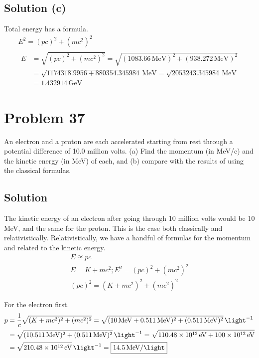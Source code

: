 \documentclass[12pt]{article}
\newcommand{\E}[1]{\times 10^{#1}}
\begin{document}
    \subsection{Solution (c)}
        Total energy has a formula.
        \begin{gather}
            E^2 = (pc)^2 + (mc^2)^2\\
            \begin{align}
                E   &=  \sqrt{(pc)^2 + (mc^2)^2}
                    =   \sqrt{(1083.66\,\unit{\mega\eV})^2 + (938.272\,\unit{\mega\eV})^2}\\
                    &=  \sqrt{1 174 318.9956 + 880 354.345984}\,\unit{\mega\eV}
                    =   \sqrt{2 053 243.345984}\,\unit{\mega\eV}\\
                    &=  \boxed{1.432914\,\unit{\giga\eV}}
            \end{align}
        \end{gather}
    \pagebreak

\section{Problem 37}
    An electron and a proton are each accelerated starting from rest through a potential difference of 10.0 million volts. 
    (a) Find the momentum (in MeV/c) and the kinetic energy (in MeV) of each, and (b) compare with the results of using the classical formulas.

    \subsection{Solution}
        The kinetic energy of an electron after going through 10 million volts would be 10 MeV, and the same for the proton.
        This is the case both classically and relativistically.
        Relativistically, we have a handful of formulas for the momentum and related to the kinetic energy.
        \begin{gather}
            E \approxeq pc\\
            E = K + mc^2; E^2 = (pc)^2 + (mc^2)^2\\
            (pc)^2 = (K + mc^2)^2 + (mc^2)^2
        \end{gather}
        
        For the electron first.
        \footnotesize
        \begin{align}
            p   &=  \frac{1}{c} \sqrt{(K + mc^2)^2 + (mc^2)^2}
                =   \sqrt{(10\,\unit{\mega\eV} + 0.511\,\unit{\mega\eV})^2 + (0.511\,\unit{\mega\eV})^2}\,\unit{\light^{-1}}\\
                &=  \sqrt{(10.511\,\unit{\mega\eV})^2 + (0.511\,\unit{\mega\eV})^2}\,\unit{\light^{-1}}
                =   \sqrt{110.48\E{12}\,\unit{\eV} + 100\E{12}\,\unit{\eV}}\\
                &=   \sqrt{210.48\E{12}\,\unit{\eV}}\,\unit{\light^{-1}}
                =  \boxed{14.5\,\unit{\mega\eV/\light}}
        \end{align}
        \normalsize
\end{document}
